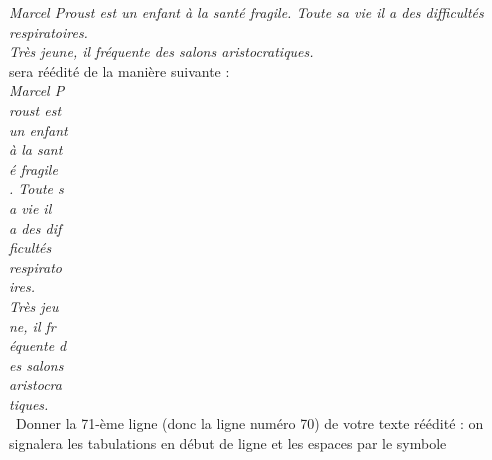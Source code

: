 \emph{Marcel Proust est un enfant à la santé fragile. Toute sa vie il a des difficultés 
respiratoires.\\
\indent Très jeune, il fréquente des salons aristocratiques.}\\

sera réédité de la manière suivante :\\

\emph{Marcel P\\
roust est\\
un enfant\\
à la sant\\
é fragile\\
. Toute s\\
a vie il \\
a des dif\\
ficultés \\
respirato\\
ires.\\
\indent Très jeu\\
ne, il fr\\
équente d\\
es salons\\
aristocra\\
tiques.}\\
 
\question\ Donner la 71-ème ligne (donc la ligne numéro 70) de votre texte réédité : on signalera les 
tabulations en début de ligne et les espaces par le symbole \Vtextvisiblespace[0.4cm]